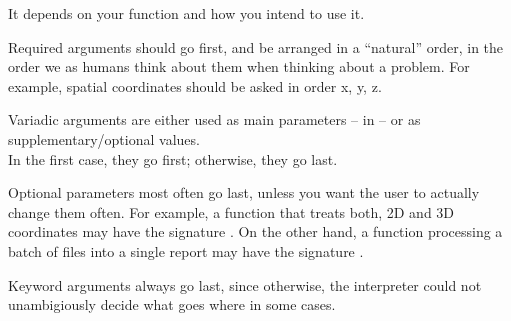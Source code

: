 \begin{frame}[fragile]
%
\begin{hintbox}
It depends on your function and how you intend to use it.

Required arguments should go first, and be arranged in a \enquote{natural} order, \ie in the order we as humans think about them when thinking about a problem. For example, spatial coordinates should be asked in order x, y, z.

Variadic arguments are either used as main parameters -- \eg in  -- or as supplementary/optional values.\\
In the first case, they go first; otherwise, they go last.

Optional parameters most often go last, unless you want the user to actually change them often. For example, a function that treats both, 2D and 3D coordinates may have the signature . On the other hand, a function processing a batch of files into a single report may have the signature 
.

Keyword arguments always go last, since otherwise, the interpreter could not unambigiously decide what goes where in some cases.
\end{hintbox}
%
\end{frame}


